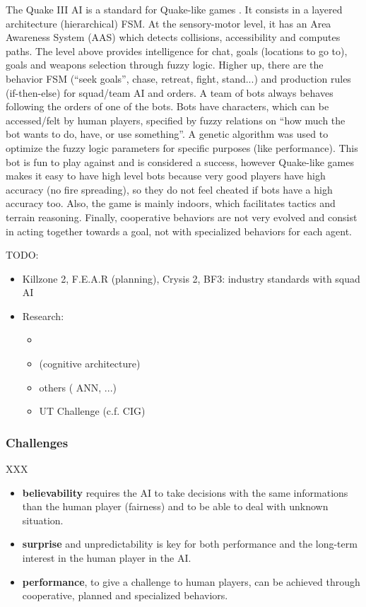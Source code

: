 The Quake III AI is a standard for Quake-like games \citep{waveren-02-artificial}. It consists in a layered architecture (hierarchical) FSM. At the sensory-motor level, it has an Area Awareness System (AAS) which detects collisions, accessibility and computes paths. The level above provides intelligence for chat, goals (locations to go to), goals and weapons selection through fuzzy logic. Higher up, there are the behavior FSM (``seek goals'', chase, retreat, fight, stand...) and production rules (if-then-else) for squad/team AI and orders. A team of bots always behaves following the orders of one of the bots. Bots have characters, which can be accessed/felt by human players, specified by fuzzy relations on ``how much the bot wants to do, have, or use something''. A genetic algorithm was used to optimize the fuzzy logic parameters for specific purposes (like performance). This bot is fun to play against and is considered a success, however Quake-like games makes it easy to have high level bots because very good players have high accuracy (no fire spreading), so they do not feel cheated if bots have a high accuracy too. Also, the game is mainly indoors, which facilitates tactics and terrain reasoning. Finally, cooperative behaviors are not very evolved and consist in acting together towards a goal, not with specialized behaviors for each agent.

TODO:
\begin{itemize}
\item Killzone 2, F.E.A.R \citep{orkinGDC_FEAR} (planning), Crysis 2, BF3: industry standards with squad AI
\item Research:
\begin{itemize}
\item \citep{lehy04}
\item \citep{Laird01} (cognitive architecture)
\item others (\citep{Hladky_anevaluation} ANN, ...)
\item UT Challenge (c.f. CIG)
\end{itemize}
\end{itemize}

\subsubsection{Challenges}

XXX
\begin{itemize}
    \item \textbf{believability} requires the AI to take decisions with the same informations than the human player (fairness) and to be able to deal with unknown situation.
    \item \textbf{surprise} and {unpredictability} is key for both performance and the long-term interest in the human player in the AI.
    \item \textbf{performance}, to give a challenge to human players, can be achieved through cooperative, planned and specialized behaviors.
\end{itemize}

